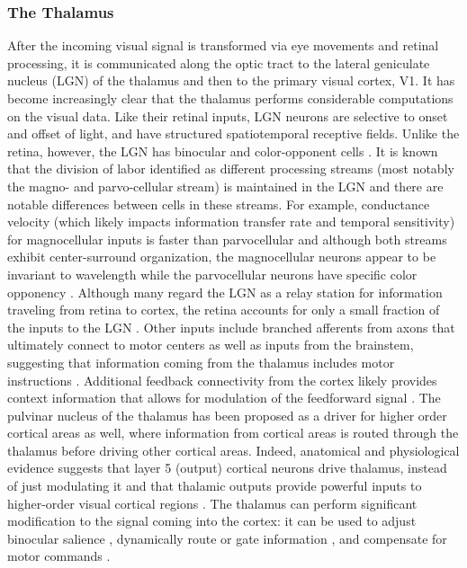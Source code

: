 \subsubsection{The Thalamus}
After the incoming visual signal is transformed via eye movements and retinal processing, it is communicated along the optic tract to the lateral geniculate nucleus (LGN) of the thalamus and then to the primary visual cortex, V1. It has become increasingly clear that the thalamus performs considerable computations on the visual data. Like their retinal inputs, LGN neurons are selective to onset and offset of light, and have structured spatiotemporal receptive fields. Unlike the retina, however, the LGN has binocular and color-opponent cells \parencite{schiller1978functional, schmielau1977role}. It is known that the division of labor identified as different processing streams (most notably the magno- and parvo-cellular stream) is maintained in the LGN and there are notable differences between cells in these streams. For example, conductance velocity (which likely impacts information transfer rate and temporal sensitivity) for magnocellular inputs is faster than parvocellular and although both streams exhibit center-surround organization, the magnocellular neurons appear to be invariant to wavelength while the parvocellular neurons have specific color opponency \parencite{schiller1978functional}. Although many regard the LGN as a relay station for information traveling from retina to cortex, the retina accounts for only a small fraction of the inputs to the LGN \parencite{weyand2016multifunctional}. Other inputs include branched afferents from axons that ultimately connect to motor centers as well as inputs from the brainstem, suggesting that information coming from the thalamus includes motor instructions \parencite{guillery2002thalamic}. Additional feedback connectivity from the cortex likely provides context information that allows for modulation of the feedforward signal \parencite{weyand2016multifunctional, ghodrati2017towards}. The pulvinar nucleus of the thalamus has been proposed as a driver for higher order cortical areas as well, where information from cortical areas is routed through the thalamus before driving other cortical areas. Indeed, anatomical and physiological evidence suggests that layer 5 (output) cortical neurons drive thalamus, instead of just modulating it and that thalamic outputs provide powerful inputs to higher-order visual cortical regions \parencite{guillery2002thalamic}. The thalamus can perform significant modification to the signal coming into the cortex: it can be used to adjust binocular salience \parencite{schmielau1977role}, dynamically route or gate information \parencite{olshausen1993neurobiological, weyand2016multifunctional}, and compensate for motor commands \parencite{guillery2011branched}.


